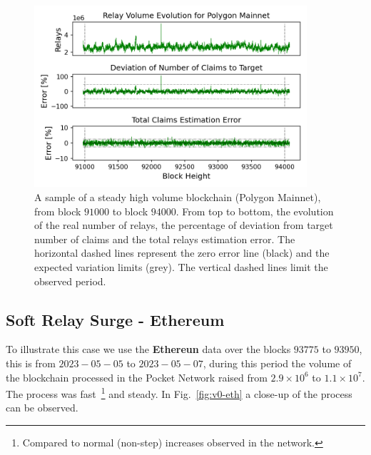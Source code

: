 \documentclass[runningheads]{llncs}
\begin{document}
\begin{figure}
    \includegraphics[width=0.9\textwidth]{v0_polygon.png}
    \caption{A sample of a steady high volume blockchain (Polygon Mainnet), from block $91000$  to block $94000$. From top to bottom, the evolution of the real number of relays, the percentage of deviation from target number of claims and the total relays estimation error. The horizontal dashed lines represent the zero error line (black) and the expected variation limits (grey). The vertical dashed lines limit the observed period.} \label{fig:v0-poly}
\end{figure}


\subsection{Soft Relay Surge - Ethereum}
To illustrate this case we use the \textbf{Ethereun} data over the blocks $93775$ to $93950$, this is from $2023-05-05$ to $2023-05-07$, during this period the volume of the blockchain processed in the Pocket Network raised from $2.9\times 10^6$ to $1.1\times 10^7$. The process was fast~\footnote{Compared to normal (non-step) increases observed in the network.} and steady. In Fig.~\ref{fig:v0-eth} a close-up of the process can be observed.
\end{document}
